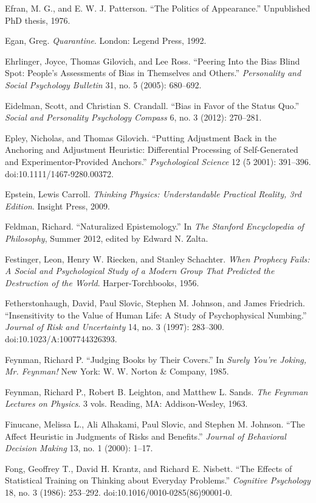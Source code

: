 {
 Efran, M. G., and E. W. J. Patterson. ``The
Politics of Appearance.'' Unpublished PhD thesis,
1976.}

{
 Egan, Greg. \textit{Quarantine}. London: Legend Press, 1992.}

{
 Ehrlinger, Joyce, Thomas Gilovich, and Lee Ross.
``Peering Into the Bias Blind Spot:
People's Assessments of Bias in Themselves and
Others.'' \textit{Personality and Social Psychology
Bulletin} 31, no. 5 (2005): 680--692.}

{
 Eidelman, Scott, and Christian S. Crandall.
``Bias in Favor of the Status Quo.''
\textit{Social and Personality Psychology Compass} 6, no. 3 (2012):
270--281.}

{
 Epley, Nicholas, and Thomas Gilovich. ``Putting
Adjustment Back in the Anchoring and Adjustment Heuristic: Differential
Processing of Self-Generated and Experimentor-Provided
Anchors.'' \textit{Psychological Science} 12 (5
2001): 391--396. doi:10.1111/1467-9280.00372.}

{
 Epstein, Lewis Carroll. \textit{Thinking Physics: Understandable
Practical Reality, 3rd Edition}. Insight Press, 2009.}

{
 Feldman, Richard. ``Naturalized
Epistemology.'' In \textit{The Stanford Encyclopedia
of Philosophy}, Summer 2012, edited by Edward N. Zalta.}

{
 Festinger, Leon, Henry W. Riecken, and Stanley Schachter.
\textit{When Prophecy Fails: A Social and Psychological Study of a
Modern Group That Predicted the Destruction of the World}.
Harper-Torchbooks, 1956.}

{
 Fetherstonhaugh, David, Paul Slovic, Stephen M. Johnson, and James
Friedrich. ``Insensitivity to the Value of Human Life:
A Study of Psychophysical Numbing.'' \textit{Journal
of Risk and Uncertainty} 14, no. 3 (1997): 283--300.
doi:10.1023/A:1007744326393.}

{
 Feynman, Richard P. ``Judging Books by Their
Covers.'' In \textit{Surely You're
Joking, Mr. Feynman!} New York: W. W. Norton \& Company, 1985.}

{
 Feynman, Richard P., Robert B. Leighton, and Matthew L. Sands.
\textit{The Feynman Lectures on Physics}. 3 vols. Reading, MA:
Addison-Wesley, 1963.}

{
 Finucane, Melissa L., Ali Alhakami, Paul Slovic, and Stephen M.
Johnson. ``The Affect Heuristic in Judgments of Risks
and Benefits.'' \textit{Journal of Behavioral
Decision Making} 13, no. 1 (2000): 1--17.}

{
 Fong, Geoffrey T., David H. Krantz, and Richard E. Nisbett.
``The Effects of Statistical Training on Thinking
about Everyday Problems.'' \textit{Cognitive
Psychology} 18, no. 3 (1986): 253--292.
doi:10.1016/0010-0285(86)90001-0.}

